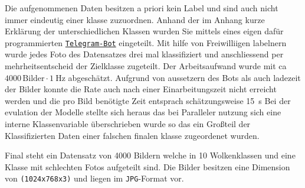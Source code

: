Die aufgenommenen Daten besitzen a priori kein Label und sind auch nicht immer
eindeutig einer klasse zuzuordnen.
Anhand der im Anhang kurze Erklärung der unterschiedlichen Klassen wurden Sie
mittels eines eigen dafür programmierten
\href{https://telegram.me/weatherpi_bot}{\texttt{Telegram-Bot}} eingeteilt.
Mit hilfe von Freiwilliigen labelnern wurde jedes Foto des Datensatzes drei mal
klassifiziert und anschliessend per mehrheitsentscheid der Zielklasse zugeteilt.
Der Arbeitsaufwand wurde mit ca $\num{4000} \, \text{Bilder} \cdot \SI{1}{\hertz}$
abgeschätzt.
Aufgrund von aussetzern des Bots als auch ladezeit der Bilder konnte die Rate
auch nach einer Einarbeitungszeit nicht erreicht werden und die pro Bild benötigte Zeit entsprach schätzungsweise
\SI{15}{\second}
Bei der evulation der Modelle stellte sich heraus das bei Paralleler nutzung
sich eine interne Klassenvariable überschrieben wurde so das ein Großteil der
Klassifizierten Daten einer falschen finalen klasse zugeordenet wurden. 

Final steht ein Datensatz von \num{4000} Bildern welche in 10 Wolkenklassen und
eine Klasse mit schlechten Fotos aufgeteilt sind. Die Bilder besitzen eine Dimension 
von \texttt{(1024x768x3)} und liegen im \texttt{JPG}-Format vor.


